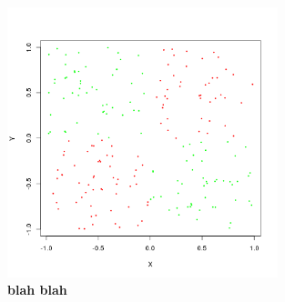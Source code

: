 \documentclass[a4paper, 11pt]{article} %
\begin{document}
\begin{figure}
  \centering
  \includegraphics[width=0.7\textwidth]{xor_classes.png}
  \caption*{\textbf{blah blah}}
\end{figure}
\end{document}
